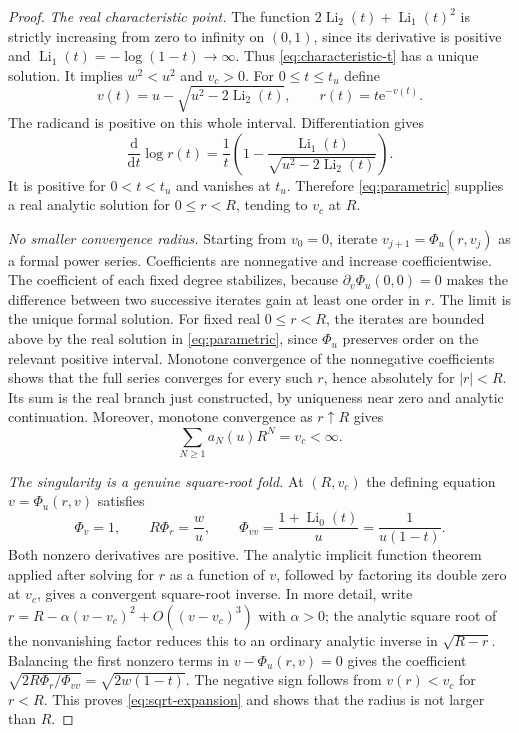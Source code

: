 \documentclass[11pt,a4paper]{article}
\theoremstyle{definition}\newtheorem{definition}[theorem]{Definition}
\theoremstyle{remark}\newtheorem{remark}[theorem]{Remark}
\newcommand{\Li}{\operatorname{Li}}
\newcommand{\ee}{\mathrm e}
\numberwithin{equation}{section}
\begin{document}
\begin{proof}
\emph{The real characteristic point.}
The function $2\Li_2(t)+\Li_1(t)^2$ is strictly increasing from zero to
infinity on $(0,1)$, since its derivative is positive and
$\Li_1(t)=-\log(1-t)\to\infty$. Thus \eqref{eq:characteristic-t} has a
unique solution. It implies $w^2<u^2$ and $v_c>0$.
For $0\le t\le t_u$ define
\begin{equation}\label{eq:parametric}
 v(t)=u-\sqrt{u^2-2\Li_2(t)},\qquad r(t)=t\ee^{-v(t)}.
\end{equation}
The radicand is positive on this whole interval. Differentiation gives
\begin{equation}\label{eq:param-derivative}
 \frac{\mathrm d}{\mathrm dt}\log r(t)
   =\frac1t\left(1-
         \frac{\Li_1(t)}{\sqrt{u^2-2\Li_2(t)}}\right).
\end{equation}
It is positive for $0<t<t_u$ and vanishes at $t_u$.
Therefore \eqref{eq:parametric} supplies a real analytic solution for
$0\le r<R$, tending to $v_c$ at $R$.

\emph{No smaller convergence radius.}
Starting from $v_0=0$, iterate $v_{j+1}=\Phi_u(r,v_j)$ as a formal power
series. Coefficients are nonnegative and increase coefficientwise. The
coefficient of each fixed degree stabilizes, because
$\partial_v\Phi_u(0,0)=0$ makes the difference between two successive
iterates gain at least one order in $r$. The limit is the unique formal
solution. For fixed real $0\le r<R$, the iterates are bounded above by
the real solution in \eqref{eq:parametric}, since $\Phi_u$ preserves
order on the relevant positive interval. Monotone convergence of the
nonnegative coefficients shows that the full series converges for every
such $r$, hence absolutely for $|r|<R$. Its sum is the real branch just
constructed, by uniqueness near zero and analytic continuation.
Moreover, monotone convergence as $r\uparrow R$ gives
\begin{equation}\label{eq:boundary-sum}
 \sum_{N\ge1}a_N(u)R^N=v_c<\infty.
\end{equation}

\emph{The singularity is a genuine square-root fold.}
At $(R,v_c)$ the defining equation $v=\Phi_u(r,v)$ satisfies
\begin{equation}\label{eq:fold-derivatives}
 \Phi_v=1,\qquad R\Phi_r=\frac wu,\qquad
 \Phi_{vv}=\frac{1+\Li_0(t)}u=\frac1{u(1-t)}.
\end{equation}
Both nonzero derivatives are positive. The analytic implicit function
theorem applied after solving for $r$ as a function of $v$, followed by
factoring its double zero at $v_c$, gives a convergent square-root
inverse. In more detail, write $r=R-\alpha(v-v_c)^2+
O((v-v_c)^3)$ with $\alpha>0$; the analytic square root of the nonvanishing
factor reduces this to an ordinary analytic inverse in
$\sqrt{R-r}$. Balancing the first nonzero terms in $v-\Phi_u(r,v)=0$
gives the coefficient $\sqrt{2R\Phi_r/\Phi_{vv}}=
\sqrt{2w(1-t)}$. The negative sign follows from $v(r)<v_c$ for $r<R$.
This proves \eqref{eq:sqrt-expansion} and shows that the radius is not
larger than $R$.


\end{proof}
\end{document}
